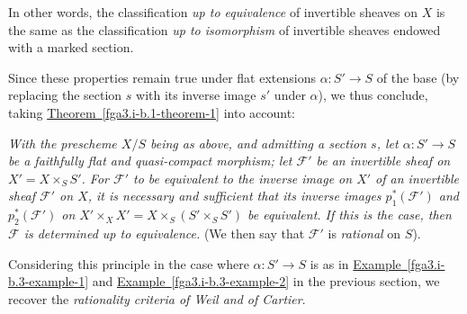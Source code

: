   In other words, the classification \emph{up to equivalence} of invertible sheaves on \(X\) is the same as the classification \emph{up to isomorphism} of invertible sheaves endowed with a marked section.\par{}Since these properties remain true under flat extensions \(\alpha \colon  S'\to  S\) of the base (by replacing the section \(s\) with its inverse image \(s'\) under \(\alpha \)), we thus conclude, taking \hyperref[fga3.i-b.1-theorem-1]{Theorem~\ref*{fga3.i-b.1-theorem-1}} into account:\par{}\emph{With the prescheme \(X/S\) being as above, and admitting a section \(s\), let \(\alpha \colon  S'\to  S\) be a faithfully flat and quasi-compact morphism; let \(\mathcal {F}'\) be an invertible sheaf on \(X'=X\times _S S'\).
    For \(\mathcal {F}'\) to be equivalent to the inverse image on \(X'\) of an invertible sheaf \(\mathcal {F}'\) on \(X\), it is necessary and sufficient that its inverse images \(p_1^*(\mathcal {F}')\) and \(p_2^*(\mathcal {F}')\) on \(X'\times _X X'=X\times _S(S'\times _S S')\) be equivalent.
    If this is the case, then \(\mathcal {F}\) is determined up to equivalence.}
  (We then say that \(\mathcal {F}'\) is \emph{rational} on \(S\)).\par{}Considering this principle in the case where \(\alpha \colon  S'\to  S\) is as in \hyperref[fga3.i-b.3-example-1]{Example~\ref*{fga3.i-b.3-example-1}} and \hyperref[fga3.i-b.3-example-2]{Example~\ref*{fga3.i-b.3-example-2}} in the previous section, we recover the \emph{rationality criteria of Weil and of Cartier}.
  
